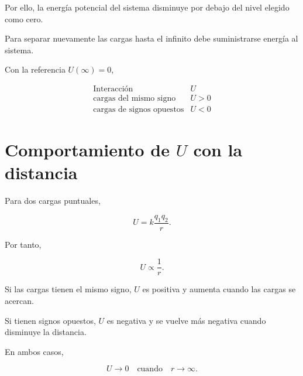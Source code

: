 Por ello, la energía potencial del sistema disminuye por debajo del nivel elegido como
cero.

Para separar nuevamente las cargas hasta el infinito debe suministrarse energía al
sistema.


\begin{idea}

Con la referencia \(U(\infty)=0\),

\[
\boxed{
\begin{array}{c|c}
\text{Interacción} & U\\
\hline
\text{cargas del mismo signo} & U>0\\
\text{cargas de signos opuestos} & U<0
\end{array}
}
\]

\end{idea}


\section{Comportamiento de \(U\) con la distancia}

Para dos cargas puntuales,

\[
U=k\frac{q_1q_2}{r}.
\]

Por tanto,

\[
U\propto\frac{1}{r}.
\]

Si las cargas tienen el mismo signo, \(U\) es positiva y aumenta cuando las cargas
se acercan.

Si tienen signos opuestos, \(U\) es negativa y se vuelve más negativa cuando disminuye
la distancia.


\begin{center}
\end{center}

En ambos casos,

\[
\boxed{U\to0\quad\text{cuando}\quad r\to\infty}.
\]


